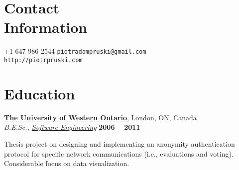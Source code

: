 \documentclass[margin,line]{resume}
\begin{document}
\begin{resume}

\section{\mysidestyle Contact\\Information}

	+1 647 986 2544	\hfill \texttt{piotradampruski@gmail.com}	\vspace{0mm}\\\vspace{0mm}
			\hfill \texttt{http://piotrpruski.com}		\vspace{0mm}\\\vspace{-4.5mm}



\section{\mysidestyle Education}

	\textbf{\href{http://www.uwo.ca/}{The University of Western Ontario}}, London, ON, Canada	\vspace{2mm}\\\vspace{1mm}
	\textsl{B.E.Sc., \href{http://www.eng.uwo.ca/undergraduate/programs/Software.html}{Software Engineering}}	\hfill \textbf{ 2006 -- 2011}\vspace{-3mm}\\\vspace{-1mm}
	\begin{list2}
		\item Thesis project on designing and implementing an anonymity authentication protocol for specific network communications (i.e., evaluations and voting). Considerable focus on data visualization.
	\end{list2}\vspace{-1.5mm}


\end{resume}
\end{document}
